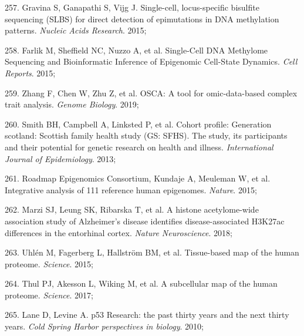 \documentclass[11pt,oneside]{bristolthesis}
\newenvironment{cslreferences}%
  {}%
  {\par}
\begin{document}
\begin{cslreferences}
\leavevmode\hypertarget{ref-Gravina2015}{}%
257. Gravina S, Ganapathi S, Vijg J. Single-cell, locus-specific bisulfite sequencing (SLBS) for direct detection of epimutations in DNA methylation patterns. \emph{Nucleic Acids Research}. 2015;

\leavevmode\hypertarget{ref-Farlik2015}{}%
258. Farlik M, Sheffield NC, Nuzzo A, et al. Single-Cell DNA Methylome Sequencing and Bioinformatic Inference of Epigenomic Cell-State Dynamics. \emph{Cell Reports}. 2015;

\leavevmode\hypertarget{ref-Zhang2019}{}%
259. Zhang F, Chen W, Zhu Z, et al. OSCA: A tool for omic-data-based complex trait analysis. \emph{Genome Biology}. 2019;

\leavevmode\hypertarget{ref-Smith2013}{}%
260. Smith BH, Campbell A, Linksted P, et al. Cohort profile: Generation scotland: Scottish family health study (GS: SFHS). The study, its participants and their potential for genetic research on health and illness. \emph{International Journal of Epidemiology}. 2013;

\leavevmode\hypertarget{ref-RoadmapEpigenomicsConsortium2015}{}%
261. Roadmap Epigenomics Consortium, Kundaje A, Meuleman W, et al. Integrative analysis of 111 reference human epigenomes. \emph{Nature}. 2015;

\leavevmode\hypertarget{ref-Marzi2018}{}%
262. Marzi SJ, Leung SK, Ribarska T, et al. A histone acetylome-wide association study of Alzheimer's disease identifies disease-associated H3K27ac differences in the entorhinal cortex. \emph{Nature Neuroscience}. 2018;

\leavevmode\hypertarget{ref-Uhlen2015}{}%
263. Uhlén M, Fagerberg L, Hallström BM, et al. Tissue-based map of the human proteome. \emph{Science}. 2015;

\leavevmode\hypertarget{ref-Thul2017}{}%
264. Thul PJ, Akesson L, Wiking M, et al. A subcellular map of the human proteome. \emph{Science}. 2017;

\leavevmode\hypertarget{ref-Lane2010}{}%
265. Lane D, Levine A. p53 Research: the past thirty years and the next thirty years. \emph{Cold Spring Harbor perspectives in biology}. 2010;
\end{cslreferences}
\end{document}
